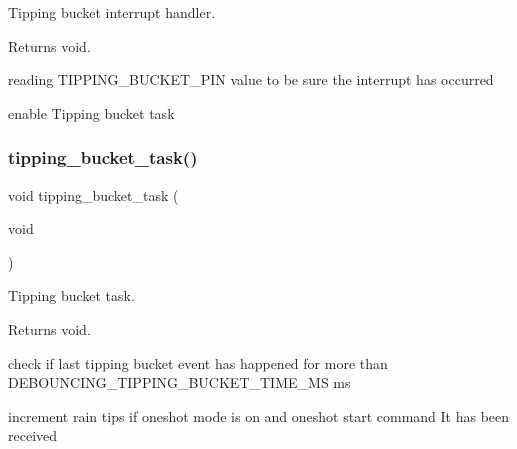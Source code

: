 Tipping bucket interrupt handler. 

\begin{DoxyReturn}{Returns}
void. 
\end{DoxyReturn}
reading T\+I\+P\+P\+I\+N\+G\+\_\+\+B\+U\+C\+K\+E\+T\+\_\+\+P\+IN value to be sure the interrupt has occurred

enable Tipping bucket task \mbox{\label{i2c-rain_8h_a8fcd3e091d63c9caff82b8bc3398c279}} 
\subsubsection{\texorpdfstring{tipping\+\_\+bucket\+\_\+task()}{tipping\_bucket\_task()}}
{\footnotesize\ttfamily void tipping\+\_\+bucket\+\_\+task (\begin{DoxyParamCaption}\item[{void}]{ }\end{DoxyParamCaption})}



Tipping bucket task. 

\begin{DoxyReturn}{Returns}
void. 
\end{DoxyReturn}
check if last tipping bucket event has happened for more than D\+E\+B\+O\+U\+N\+C\+I\+N\+G\+\_\+\+T\+I\+P\+P\+I\+N\+G\+\_\+\+B\+U\+C\+K\+E\+T\+\_\+\+T\+I\+M\+E\+\_\+\+MS ms

increment rain tips if oneshot mode is on and oneshot start command It has been received 